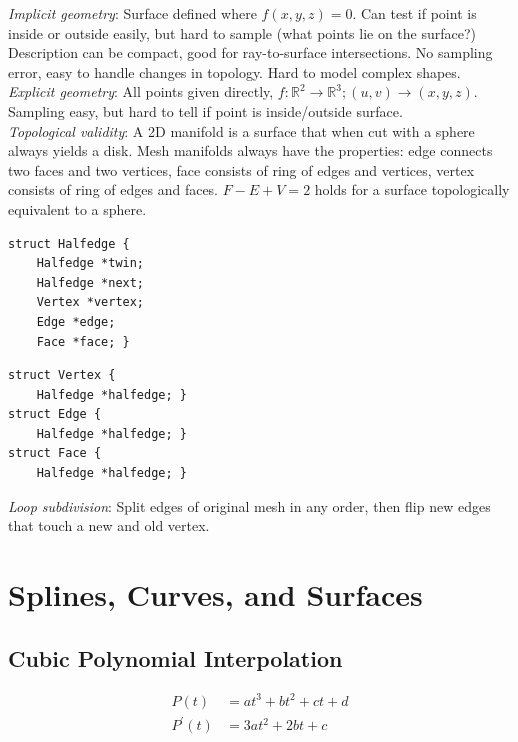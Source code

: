 \documentclass[10pt,landscape]{article}
\begin{document}
\begin{multicols}{3}
\textit{Implicit geometry}: Surface defined where $f(x, y, z) = 0$. Can test if point is inside or outside easily, but hard to sample (what points lie on the surface?) Description can be compact, good for ray-to-surface intersections. No sampling error, easy to handle changes in topology. Hard to model complex shapes. \\
\textit{Explicit geometry}: All points given directly, $f : \mathbb{R}^2 \rightarrow \mathbb{R}^3; (u, v) \rightarrow (x, y, z)$. Sampling easy, but hard to tell if point is inside/outside surface. \\
\textit{Topological validity}: A 2D manifold is a surface that when cut with a sphere always yields a disk. Mesh manifolds always have the properties: edge connects two faces and two vertices, face consists of ring of edges and vertices, vertex consists of ring of edges and faces. $F - E + V = 2$ holds for a surface topologically equivalent to a sphere.

\begin{multicols}{2}
\begin{verbatim}
struct Halfedge {
    Halfedge *twin;
    Halfedge *next;
    Vertex *vertex;
    Edge *edge;
    Face *face; }
\end{verbatim}

\columnbreak

\begin{verbatim}
struct Vertex {
    Halfedge *halfedge; }
struct Edge {
    Halfedge *halfedge; }
struct Face {
    Halfedge *halfedge; }
\end{verbatim}
\end{multicols}

\textit{Loop subdivision}: Split edges of original mesh in any order, then flip new edges that touch a new and old vertex.


\section{Splines, Curves, and Surfaces}

\subsection{Cubic Polynomial Interpolation}

\begin{align*}
    P(t) &= at^3 + bt^2 + ct + d \\
    P^{\prime}(t) &= 3at^2 + 2bt + c
\end{align*}


\end{multicols}
\end{document}
